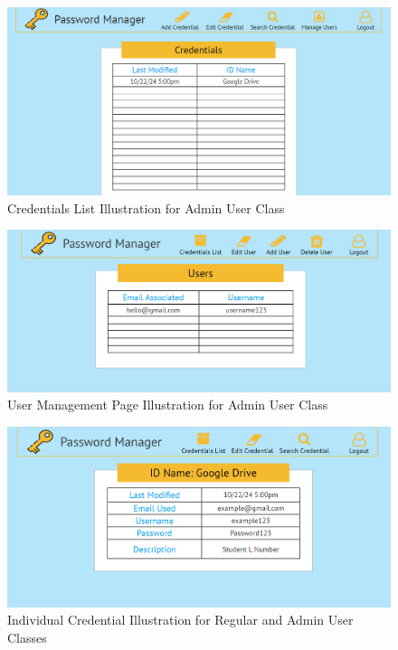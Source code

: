 \documentclass[letterpaper,12pt,oneside,listof=totoc]{scrreprt}
\begin{document}
\begin{figure}
\centering
\includegraphics[width=\linewidth]{UI_CredentialList_A.png}
\caption{Credentials List Illustration for Admin User Class}
\label{CredList_AU}
\end{figure}

\begin{figure}
\centering
\includegraphics[width=\linewidth]{UI_UserManagement.png}
\caption{User Management Page Illustration for Admin User Class}
\label{UserManagment}
\end{figure}

\begin{figure}
\centering
\includegraphics[width=\linewidth]{UI_Credential.png}
\caption{Individual Credential Illustration for Regular and Admin User Classes}
\label{IndivCred_RAU}
\end{figure}
\end{document}
